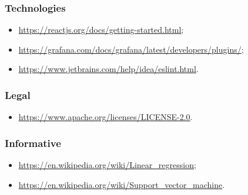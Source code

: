 \subsubsection{Technologies}
\begin{itemize}
	\item \url{https://reactjs.org/docs/getting-started.html};
	\item \url{https://grafana.com/docs/grafana/latest/developers/plugins/};
	\item \url{https://www.jetbrains.com/help/idea/eslint.html}.
\end{itemize}
\subsubsection{Legal}
\begin{itemize}
	\item \url{https://www.apache.org/licenses/LICENSE-2.0}.
\end{itemize}

\subsubsection{Informative}
\begin{itemize}
	\item \url{https://en.wikipedia.org/wiki/Linear_regression};
	\item \url{https://en.wikipedia.org/wiki/Support_vector_machine}.
\end{itemize}
	

